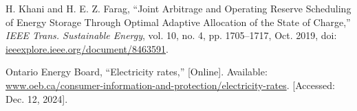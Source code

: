 \documentclass[conference]{IEEEtran}
\begin{document}
\begin{thebibliography}{00}
 H. Khani and H. E. Z. Farag, ``Joint Arbitrage and Operating Reserve Scheduling of Energy Storage Through Optimal Adaptive Allocation of the State of Charge,'' \textit{IEEE Trans. Sustainable Energy}, vol. 10, no. 4, pp. 1705--1717, Oct. 2019, doi: \href{https://ieeexplore.ieee.org/document/8463591}{ieeexplore.ieee.org/document/8463591}.

Ontario Energy Board, ``Electricity rates,'' [Online]. Available: \href{https://www.oeb.ca/consumer-information-and-protection/electricity-rates}{www.oeb.ca/consumer-information-and-protection/electricity-rates}. [Accessed: Dec. 12, 2024].


\end{thebibliography}
\end{document}
